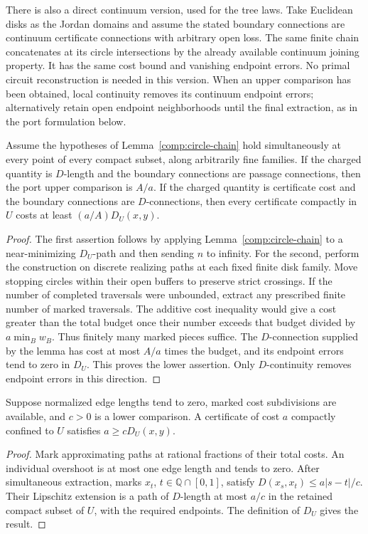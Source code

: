 There is also a direct continuum version, used for the tree laws.
Take Euclidean disks as the Jordan domains and assume the stated
boundary connections are continuum certificate connections with
arbitrary open loss.  The same finite chain concatenates at its circle
intersections by the already available continuum joining property.
It has the same cost bound and vanishing endpoint errors.  No primal
circuit reconstruction is needed in this version.  When an upper
comparison has been obtained, local continuity removes its continuum
endpoint errors; alternatively retain open endpoint neighborhoods until
the final extraction, as in the port formulation below.

\begin{corollary}\label{comp:annulus-comparison}
Assume the hypotheses of Lemma~\ref{comp:circle-chain} hold simultaneously
at every point of every compact subset, along arbitrarily fine families.
If the charged quantity is $D$-length and the boundary connections are
passage connections, then the port upper comparison is $A/a$.
If the charged quantity is certificate cost and the boundary connections
are $D$-connections, then every certificate compactly in $U$ costs at
least $(a/A)D_U(x,y)$.
\end{corollary}

\begin{proof}
The first assertion follows by applying Lemma~\ref{comp:circle-chain} to
a near-minimizing $D_U$-path and then sending $n$ to infinity.  For the
second, perform the construction on discrete realizing paths at each
fixed finite disk family.  Move stopping circles within their open
buffers to preserve strict crossings.  If the number of completed
traversals were unbounded, extract any prescribed finite number of
marked traversals.  The additive cost inequality would give a cost
greater than the total budget once their number exceeds that budget
divided by $a\min_B w_B$.  Thus finitely many marked pieces suffice.
The $D$-connection supplied by the lemma has cost at most $A/a$ times the
budget, and its endpoint errors tend to zero in $D_U$.  This proves the
lower assertion.  Only $D$-continuity removes endpoint errors in this
direction.
\end{proof}

\begin{lemma}
\label{comp:intrinsic-lower}
Suppose normalized edge lengths tend to zero, marked cost subdivisions
are available, and $c>0$ is a lower comparison.  A certificate of cost $a$
compactly confined to $U$ satisfies $a\ge cD_U(x,y)$.
\end{lemma}

\begin{proof}
Mark approximating paths at rational fractions of their total costs.
An individual overshoot is at most one edge length and tends to zero.
After simultaneous extraction, marks $x_t$, $t\in\mathbb Q\cap[0,1]$,
satisfy $D(x_s,x_t)\le a|s-t|/c$.  Their Lipschitz extension is a path
of $D$-length at most $a/c$ in the retained compact subset of $U$, with
the required endpoints.  The definition of $D_U$ gives the result.
\end{proof}

